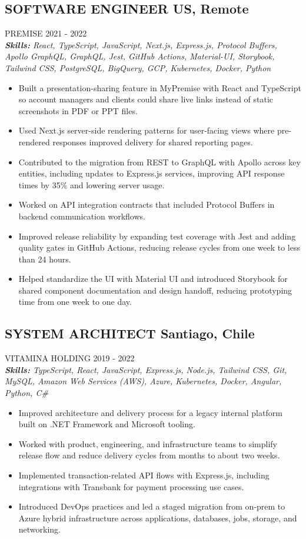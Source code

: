 \documentclass{article}
\newcommand{\WorkExperience}[2]{
   \subsection*{#1}
   \vspace{-1em}
   \uppercase{#2}
}
\newcommand{\Skills}[1]{
   \textit{\textbf{Skills:} #1}
}
\begin{document}
\WorkExperience{SOFTWARE ENGINEER \hfill US, Remote}{Premise \hfill 2021 {-} 2022} \\
\Skills{React, TypeScript, JavaScript, Next.js, Express.js, Protocol Buffers, Apollo GraphQL, GraphQL, Jest, GitHub Actions, Material-UI, Storybook, Tailwind CSS, PostgreSQL, BigQuery, GCP, Kubernetes, Docker, Python}
\begin{itemize}
\item Built a presentation-sharing feature in MyPremise with React and TypeScript so account managers and clients could share live links instead of static screenshots in PDF or PPT files.
\item Used Next.js server-side rendering patterns for user-facing views where pre-rendered responses improved delivery for shared reporting pages.
\item Contributed to the migration from REST to GraphQL with Apollo across key entities, including updates to Express.js services, improving API response times by 35\% and lowering server usage.
\item Worked on API integration contracts that included Protocol Buffers in backend communication workflows.
\item Improved release reliability by expanding test coverage with Jest and adding quality gates in GitHub Actions, reducing release cycles from one week to less than 24 hours.
\item Helped standardize the UI with Material UI and introduced Storybook for shared component documentation and design handoff, reducing prototyping time from one week to one day.
\end{itemize}

\WorkExperience{SYSTEM ARCHITECT \hfill Santiago, Chile}{Vitamina Holding \hfill 2019 {-} 2022} \\
\Skills{TypeScript, React, JavaScript, Express.js, Node.js, Tailwind CSS, Git, MySQL, Amazon Web Services (AWS), Azure, Kubernetes, Docker, Angular, Python, C\#}
\begin{itemize}
\item Improved architecture and delivery process for a legacy internal platform built on .NET Framework and Microsoft tooling.
\item Worked with product, engineering, and infrastructure teams to simplify release flow and reduce delivery cycles from months to about two weeks.
\item Implemented transaction-related API flows with Express.js, including integrations with Transbank for payment processing use cases.
\item Introduced DevOps practices and led a staged migration from on-prem to Azure hybrid infrastructure across applications, databases, jobs, storage, and networking.
\end{itemize}
\end{document}
